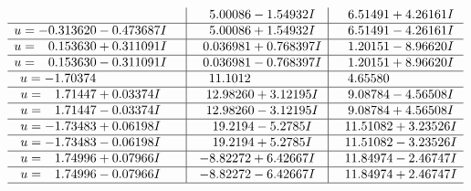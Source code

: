 \documentclass[1p]{elsarticle_modified}
\theoremstyle{definition}
\begin{document}
$$\begin{array}{c|c|c}
 & \phantom{-}5.00086 - 1.54932 I & \phantom{-}6.51491 + 4.26161 I \\ \hline\begin{aligned}
u &= -0.313620 - 0.473687 I\end{aligned}
 & \phantom{-}5.00086 + 1.54932 I & \phantom{-}6.51491 - 4.26161 I \\ \hline\begin{aligned}
u &= \phantom{-}0.153630 + 0.311091 I\end{aligned}
 & \phantom{-}0.036981 + 0.768397 I & \phantom{-}1.20151 - 8.96620 I \\ \hline\begin{aligned}
u &= \phantom{-}0.153630 - 0.311091 I\end{aligned}
 & \phantom{-}0.036981 - 0.768397 I & \phantom{-}1.20151 + 8.96620 I \\ \hline\begin{aligned}
u &= -1.70374\phantom{ +0.000000I}\end{aligned}
 & \phantom{-}11.1012\phantom{ +0.000000I} & \phantom{-}4.65580\phantom{ +0.000000I} \\ \hline\begin{aligned}
u &= \phantom{-}1.71447 + 0.03374 I\end{aligned}
 & \phantom{-}12.98260 + 3.12195 I & \phantom{-}9.08784 - 4.56508 I \\ \hline\begin{aligned}
u &= \phantom{-}1.71447 - 0.03374 I\end{aligned}
 & \phantom{-}12.98260 - 3.12195 I & \phantom{-}9.08784 + 4.56508 I \\ \hline\begin{aligned}
u &= -1.73483 + 0.06198 I\end{aligned}
 & \phantom{-}19.2194 - 5.2785 I & \phantom{-}11.51082 + 3.23526 I \\ \hline\begin{aligned}
u &= -1.73483 - 0.06198 I\end{aligned}
 & \phantom{-}19.2194 + 5.2785 I & \phantom{-}11.51082 - 3.23526 I \\ \hline\begin{aligned}
u &= \phantom{-}1.74996 + 0.07966 I\end{aligned}
 & -8.82272 + 6.42667 I & \phantom{-}11.84974 - 2.46747 I \\ \hline\begin{aligned}
u &= \phantom{-}1.74996 - 0.07966 I\end{aligned}
 & -8.82272 - 6.42667 I & \phantom{-}11.84974 + 2.46747 I\\
 \hline 
 \end{array}$$\newpage
\end{document}
